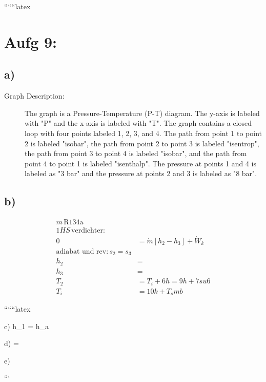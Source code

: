 
``````latex


\section*{Aufg 9:}

\subsection*{a)}

\begin{description}
    \item[Graph Description:] The graph is a Pressure-Temperature (P-T) diagram. The y-axis is labeled with "P" and the x-axis is labeled with "T". The graph contains a closed loop with four points labeled 1, 2, 3, and 4. The path from point 1 to point 2 is labeled "isobar", the path from point 2 to point 3 is labeled "isentrop", the path from point 3 to point 4 is labeled "isobar", and the path from point 4 to point 1 is labeled "isenthalp". The pressure at points 1 and 4 is labeled as "3 bar" and the pressure at points 2 and 3 is labeled as "8 bar".
\end{description}

\subsection*{b)}

\begin{align*}
    \dot{m} \, \text{R134a} \\
    1HS \, \text{verdichter:} \\
    0 &= \dot{m} \left[ h_2 - h_3 \right] + \dot{W}_k \\
    \text{adiabat und rev:} \, s_2 = s_3 \\
    h_2 &= \\
    h_3 &= \\
    T_2 &= T_i + 6h = 9h + 7su6 \\
    T_i &= 10k + T_smb
\end{align*}

``````latex

c) \quad h_1 = h_a

\vspace{2cm}

d) \quad {} = 

\vspace{2cm}

e)

```